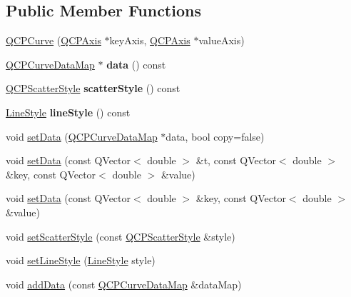 \subsection*{Public Member Functions}
\begin{DoxyCompactItemize}
\item 
\hyperlink{class_q_c_p_curve_a36de58e2652b3fa47bdf9187d421d3ce}{Q\+C\+P\+Curve} (\hyperlink{class_q_c_p_axis}{Q\+C\+P\+Axis} $\ast$key\+Axis, \hyperlink{class_q_c_p_axis}{Q\+C\+P\+Axis} $\ast$value\+Axis)
\item 
\mbox{\label{class_q_c_p_curve_a667ca2594cf651e3032c624dbaa95add}} 
\hyperlink{qcustomplot_8h_a444d37ec9cb2951b3a7fe443c34d1658}{Q\+C\+P\+Curve\+Data\+Map} $\ast$ {\bfseries data} () const
\item 
\mbox{\label{class_q_c_p_curve_afa6bd72a3a331a5ed45d3e0c5843b592}} 
\hyperlink{class_q_c_p_scatter_style}{Q\+C\+P\+Scatter\+Style} {\bfseries scatter\+Style} () const
\item 
\mbox{\label{class_q_c_p_curve_a06e3cf3f8f1add689254b3cda66e040e}} 
\hyperlink{class_q_c_p_curve_a2710e9f79302152cff794c6e16cc01f1}{Line\+Style} {\bfseries line\+Style} () const
\item 
void \hyperlink{class_q_c_p_curve_a631ac886708460013b30052f49cbc9da}{set\+Data} (\hyperlink{qcustomplot_8h_a444d37ec9cb2951b3a7fe443c34d1658}{Q\+C\+P\+Curve\+Data\+Map} $\ast$data, bool copy=false)
\item 
void \hyperlink{class_q_c_p_curve_affe80e011e2ced62a88f614acd6ab8d1}{set\+Data} (const Q\+Vector$<$ double $>$ \&t, const Q\+Vector$<$ double $>$ \&key, const Q\+Vector$<$ double $>$ \&value)
\item 
void \hyperlink{class_q_c_p_curve_a963d4c45777deef15848a8f56172d066}{set\+Data} (const Q\+Vector$<$ double $>$ \&key, const Q\+Vector$<$ double $>$ \&value)
\item 
void \hyperlink{class_q_c_p_curve_a55e43b44709bf50a35500644988aa706}{set\+Scatter\+Style} (const \hyperlink{class_q_c_p_scatter_style}{Q\+C\+P\+Scatter\+Style} \&style)
\item 
void \hyperlink{class_q_c_p_curve_a4a377ec863ff81a1875c3094a6177c19}{set\+Line\+Style} (\hyperlink{class_q_c_p_curve_a2710e9f79302152cff794c6e16cc01f1}{Line\+Style} style)
\item 
void \hyperlink{class_q_c_p_curve_a4e24023c3b9ac75440c7a260172c99af}{add\+Data} (const \hyperlink{qcustomplot_8h_a444d37ec9cb2951b3a7fe443c34d1658}{Q\+C\+P\+Curve\+Data\+Map} \&data\+Map)

\end{DoxyCompactItemize}
